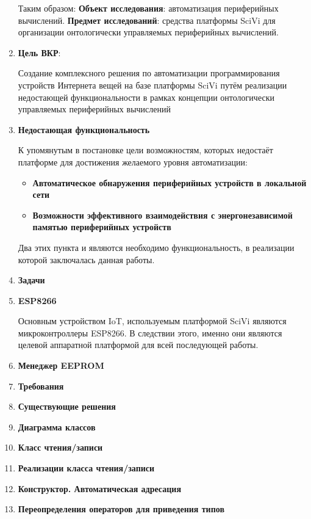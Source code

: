 \documentclass[14pt]{extarticle}
\begin{document}
\begin{enumerate}
	Таким образом:
	\textbf{Объект исследования}: автоматизация периферийных вычислений.
	\textbf{Предмет исследований}: средства платформы SciVi для организации онтологически управляемых периферийных вычислений.
	\item \textbf{Цель ВКР}:

	Создание комплексного решения по  автоматизации программирования устройств Интернета вещей на базе платформы SciVi путём реализации недостающей функциональности в рамках концепции онтологически управляемых периферийных вычислений
	\item \textbf{Недостающая функциональность}

	К упомянутым в постановке цели возможностям, которых недостаёт платформе для достижения желаемого уровня автоматизации:
	\begin{itemize}
		\item \textbf{Автоматическое обнаружения периферийных устройств в локальной сети}
		\item \textbf{Возможности эффективного взаимодействия с энергонезависимой памятью периферийных устройств}
	\end{itemize}
	Два этих пункта и являются необходимо функциональность, в реализации которой заключалась данная работы.
	\item \textbf{Задачи}

	\item \textbf{ESP8266}

	Основным устройством IoT, используемым платформой SciVi являются микроконтроллеры ESP8266. В следствии этого, именно они являются целевой аппаратной платформой для всей последующей работы.
	\item \textbf{Менеджер EEPROM}

	\item \textbf{Требования}

	\item \textbf{Существующие решения}

	\item \textbf{Диаграмма классов}

	\item \textbf{Класс чтения/записи}

	\item \textbf{Реализации класса чтения/записи}

	\item \textbf{Конструктор. Автоматическая адресация}

	\item \textbf{Переопределения операторов для приведения типов}


\end{enumerate}
\end{document}
